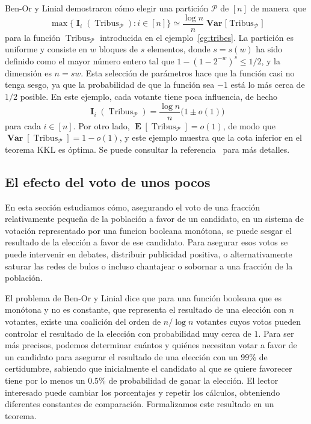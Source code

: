 \documentclass[autocontact]{gaceta}
\DeclareMathOperator{\Var}{\mathbf{Var}}
\DeclareMathOperator{\II}{\mathbf{I}}
\DeclareMathOperator{\EE}{\mathbf{E}}
\DeclareMathOperator{\Tribus}{Tribus}
\begin{document}
Ben-Or y Linial \cite{BL85} demostraron cómo elegir una partición $\mathcal{P}$ de $[n]$ de manera~que
\[
   \max\{\II_i(\Tribus_{\mathcal{P}}):i\in [n]\}
   \simeq \frac{\log n}{n} \Var\big[\Tribus_{\mathcal{P}}\big]
\]
para la función $\Tribus_{\mathcal{P}}$ introducida en el ejemplo~\ref{eg:tribes}. La partición es uniforme y consiste en $w$ bloques de $s$ elementos, donde $s=s(w)$ ha sido definido como el mayor número entero tal que $1-(1-2^{-w})^s \leq 1/2$, y la dimensión es $n=sw$. Esta selección de parámetros hace que la función casi no tenga sesgo, ya que la probabilidad de que la función sea $-1$ está lo más cerca de $1/2$ posible.
En este ejemplo, cada votante tiene poca influencia, de hecho
\[
\II_i(\Tribus_{\mathcal{P}}) = \frac{\log n}{n} \big(1\pm o(1)\big)
\]
para cada $i\in [n]$. Por otro lado, $\EE[\Tribus_{\mathcal{P}}]=o(1)$, de modo que $\Var[\Tribus_{\mathcal{P}}] = 1 - o(1)$, y este ejemplo muestra que la cota inferior en el teorema KKL es óptima. Se puede consultar la referencia~\cite[sección 4.2]{O'Do21} para más detalles.

\subsection{El efecto del voto de unos pocos}\label{sec:problemaBen-Or_Linial}

En esta sección estudiamos cómo, asegurando el voto de una fracción relativamente pequeña de la población a favor de un candidato, en un sistema de votación representado por una funcion booleana monótona, se puede sesgar el resultado de la elección a favor de ese candidato. Para asegurar esos votos se puede intervenir en debates, distribuir publicidad positiva, o alternativamente saturar las redes de bulos o incluso chantajear o sobornar a una fracción de la población.

El problema de Ben-Or y Linial dice que para una función booleana que es monótona y no es constante, que representa el resultado de una elección con $n$ votantes, existe una coalición del orden de $n/ \log n$ votantes cuyos votos pueden controlar el resultado de la elección con probabilidad muy cerca de $1$. Para ser más precisos, podemos determinar cuántos y quiénes necesitan votar a favor de un candidato para asegurar el resultado de una elección con un $99\%$ de certidumbre, sabiendo que inicialmente el candidato al que se quiere favorecer tiene por lo menos un $0.5\%$ de probabilidad de ganar la elección. El lector interesado puede cambiar los porcentajes y repetir los cálculos, obteniendo diferentes constantes de comparación. Formalizamos este resultado en un teorema.
\end{document}
